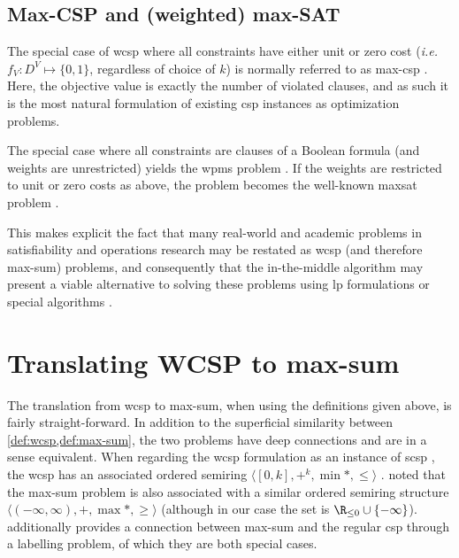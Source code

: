 \subsection{Max-CSP and (weighted) max-SAT}
The special case of \gls{wcsp} where all constraints have either unit or zero cost (\emph{i.e.} \(f_V : D^V \mapsto \{0,1\}\), regardless of choice of \(k\)) is normally referred to as max-\gls{csp} \parencite[\pno~284]{Meseguer06}.
Here, the objective value is exactly the number of violated clauses, and as such it is the most natural formulation of existing \gls{csp} instances as optimization problems.

The special case where all constraints are clauses of a Boolean formula (and weights are unrestricted) yields the \gls{wpms} problem \parencite{deGivry14}.
If the weights are restricted to unit or zero costs as above, the problem becomes the well-known \gls{maxsat} problem \parencite[\pno~284]{Meseguer06}.

This makes explicit the fact that many real-world and academic problems in satisfiability and operations research may be restated as \gls{wcsp} (and therefore max-sum) problems, and consequently that the in-the-middle algorithm may present a viable alternative to solving these problems using \gls{lp} formulations \parencites{Ansotegui13a}{Davies13} or special algorithms \parencites{Ansotegui13b}{Larrosa08}.

\section{Translating WCSP to max-sum}
The translation from \gls{wcsp} to max-sum, when using the definitions given above, is fairly straight-forward.
In addition to the superficial similarity between \cref{def:wcsp,def:max-sum}, the two problems have deep connections and are in a sense equivalent.
When regarding the \gls{wcsp} formulation as an instance of \gls{scsp} \parencite[\pno~285\psq]{Meseguer06}, the \gls{wcsp} has an associated ordered semiring \(\langle [0,k],+^k,\min*,\leq\rangle\) \parencite[\pno~290]{Meseguer06}.
\Textcite[\pno~1167]{Werner07} noted that the max-sum problem is also associated with a similar ordered semiring structure \(\langle (-\infty,\infty),+,\max*,\geq\rangle\) (although in our case the set is \(\Rminus \cup \{-\infty\}\)).
 additionally provides a connection between max-sum and the regular \gls{csp} through a labelling problem, of which they are both special cases.

